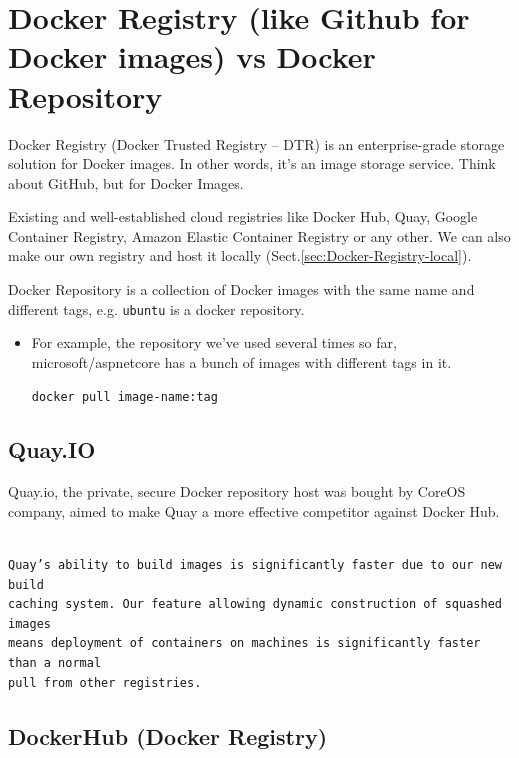 \section{Docker Registry (like Github for Docker images) vs Docker Repository}
\label{sec:Docker-Registry}
\label{sec:Docker-Repository}

Docker Registry (Docker Trusted Registry – DTR) is an enterprise-grade storage
solution for Docker images. In other words, it’s an image storage service. Think
about GitHub, but for Docker Images.

Existing and well-established cloud registries like Docker Hub, Quay, Google
Container Registry, Amazon Elastic Container Registry or any other. We can also
make our own registry and host it locally
(Sect.\ref{sec:Docker-Registry-local}).


Docker Repository is a collection of Docker images with the same name and
different tags, e.g. \verb!ubuntu! is a docker repository.
\begin{itemize}
  \item   
  For example, the repository we’ve used several times so far,
  microsoft/aspnetcore has a bunch of images with different tags in it.
  
\begin{verbatim}
docker pull image-name:tag
\end{verbatim}
\end{itemize}

\subsection{Quay.IO}
\label{sec:Quay.IO}

Quay.io, the private, secure Docker repository host was bought by CoreOS
company, aimed to make Quay a more effective competitor against Docker Hub.

\begin{verbatim}

Quay’s ability to build images is significantly faster due to our new build
caching system. Our feature allowing dynamic construction of squashed images
means deployment of containers on machines is significantly faster than a normal
pull from other registries.

\end{verbatim}

\subsection{DockerHub (Docker Registry)}
\label{sec:DockerHub}

